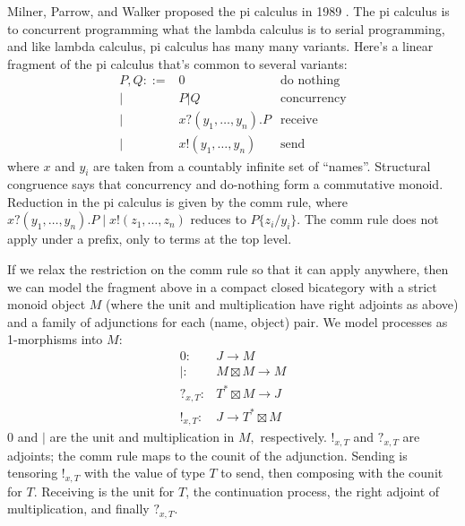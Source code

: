 \documentclass[12pt,twoside,openright]{report}
\newcommand{\maps}{\colon}
\begin{document}
Milner, Parrow, and Walker proposed the pi calculus in 1989 \cite{MPW89}.  The pi calculus is to concurrent programming what the lambda calculus is to serial programming, and like lambda calculus, pi calculus has many many variants.  Here's a linear fragment of the pi calculus that's common to several variants:
\[\begin{array}{rll}
  P,Q ::= & 0 & \mbox{do nothing} \\
  |& P | Q & \mbox{concurrency}\\
  |& x?(y_1, \ldots, y_n).P & \mbox{receive}\\
  |& x!(y_1, \ldots, y_n) & \mbox{send}
\end{array}\]
where $x$ and $y_i$ are taken from a countably infinite set of ``names''.  Structural congruence says that concurrency and do-nothing form a commutative monoid.  Reduction in the pi calculus is given by the comm rule, where $x?(y_1, \ldots, y_n).P \;|\; x!(z_1, \ldots, z_n)$ reduces to $P\{z_i / y_i\}$.  The comm rule does not apply under a prefix, only to terms at the top level.

If we relax the restriction on the comm rule so that it can apply anywhere, then we can model the fragment above in a compact closed bicategory with a strict monoid object $M$ (where the unit and multiplication have right adjoints as above) and a family of adjunctions for each (name, object) pair.  We model processes as 1-morphisms into $M$:
\[\begin{array}{rl}
0\maps & J \to M\\
|\maps & M \boxtimes M \to M\\
?_{x, T}\maps & T^* \boxtimes M \to J\\
!_{x, T}\maps & J \to T^* \boxtimes M
\end{array}\]
$0$ and $|$ are the unit and multiplication in $M,$ respectively.  $!_{x, T}$ and $?_{x, T}$ are adjoints; the comm rule maps to the counit of the adjunction.  Sending is tensoring $!_{x,T}$ with the value of type $T$ to send, then composing with the counit for $T.$  Receiving is the unit for $T$, the continuation process, the right adjoint of multiplication, and finally $?_{x, T}.$
\end{document}
